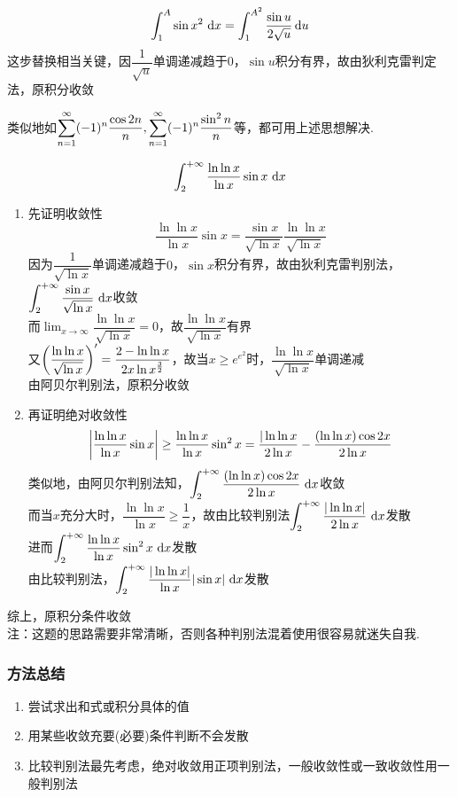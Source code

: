 \begin{analysis}
\[\displaystyle\int_{1}^{A}{\sin x^2}\,\,\mathrm{d} x=\int_{1}^{A^2}\dfrac{\sin u}{2\sqrt{u}}\,\mathrm{d}u\]
这步替换相当关键，因$\dfrac{1}{\sqrt{u}}$单调递减趋于$0$，$\sin u$积分有界，故由狄利克雷判定法，原积分收敛
\end{analysis}
\par 类似地如$\displaystyle\sum_{n=1}^{\infty}(-1)^n\dfrac{\cos 2n}{n},\displaystyle\sum_{n=1}^{\infty}(-1)^n\dfrac{\sin^2 n}{n}$等，都可用上述思想解决.
\begin{example}
\[\displaystyle\int_{2}^{+\infty}{\dfrac{\ln\ln x}{\ln x}\sin x}\,\,\mathrm{d} x\]
\end{example}
\begin{analysis}
\begin{enumerate}
	\item 先证明收敛性
\[\dfrac{\ln\ln x}{\ln x}\sin x=\dfrac{\sin x}{\sqrt{\ln x}}\dfrac{\ln\ln x}{\sqrt{\ln x}}\]
因为$\dfrac{1}{\sqrt{\ln x}}$单调递减趋于$0$，$\sin x$积分有界，故由狄利克雷判别法，$\displaystyle\int_{2}^{+\infty}{\dfrac{\sin x}{\sqrt{\ln x}}}\,\,\mathrm{d} x$收敛\\
而$\lim_{x\to\infty}\dfrac{\ln\ln x}{\sqrt{\ln x}}=0$，故$\dfrac{\ln\ln x}{\sqrt{\ln x}}$有界\\
又$\left(\dfrac{\ln\ln x}{\sqrt{\ln x}}\right)'=\dfrac{2 - \ln\ln x}{2 x \ln x^{\frac{3}{2}}}$，故当$x\geq e^{e^2}$时，$\dfrac{\ln\ln x}{\sqrt{\ln x}}$单调递减\\
由阿贝尔判别法，原积分收敛
\item 再证明绝对收敛性
\[\left|\dfrac{\ln\ln x}{\ln x}\sin x\right|\geq\dfrac{\ln\ln x}{\ln x}\sin^2 x=\dfrac{|\ln\ln x}{2\ln x}-\dfrac{(\ln\ln x)\cos 2x}{2\ln x}\]
类似地，由阿贝尔判别法知，$\displaystyle\int_{2}^{+\infty}{\dfrac{(\ln\ln x)\cos 2x}{2\ln x}}\,\,\mathrm{d} x$收敛\\
而当$x$充分大时，$\dfrac{\ln\ln x}{\ln x}\geq\dfrac{1}{x}$，故由比较判别法$\displaystyle\int_{2}^{+\infty}{\dfrac{|\ln\ln x|}{2\ln x}}\,\,\mathrm{d} x$发散\\
进而$\displaystyle\int_{2}^{+\infty}{\dfrac{\ln\ln x}{\ln x}\sin^2 x}\,\,\mathrm{d} x$发散\\
由比较判别法，$\displaystyle\int_{2}^{+\infty}{\dfrac{|\ln\ln x|}{\ln x}|\sin x|}\,\,\mathrm{d} x$发散
\end{enumerate}
综上，原积分条件收敛\\
注：这题的思路需要非常清晰，否则各种判别法混着使用很容易就迷失自我.
\end{analysis}

\subsubsection{方法总结}
\begin{enumerate}
	\itemsep -3pt
	\item 尝试求出和式或积分具体的值
	\item 用某些收敛充要(必要)条件判断不会发散
	\item 比较判别法最先考虑，绝对收敛用正项判别法，一般收敛性或一致收敛性用一般判别法
\end{enumerate}

